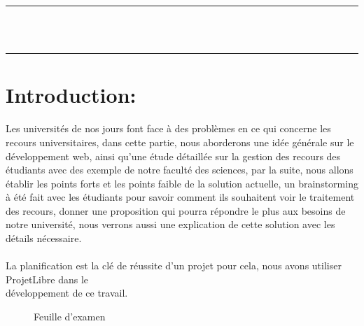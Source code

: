 \documentclass[12pt]{report}
\begin{document}
\newpage

\vspace*{\fill}
\begin{center}
    {\color{Blue} \rule{\linewidth}{1.2mm} }\\
\vspace{0.25in}
 {\centering{}}
\vspace{0.35in}\\
    {\color{Blue} \rule{\linewidth}{1.2mm} }
\end{center}
\vspace*{\fill}
\setcounter{section}{0}

\newpage

\section{Introduction:}
\vspace{0.2in}
Les universités de nos jours font face à des problèmes en ce qui concerne les recours universitaires, dans cette partie, nous aborderons une idée générale sur le développement web, ainsi qu'une étude détaillée sur la gestion des recours des étudiants avec des exemple de notre faculté des sciences, par la suite, nous allons établir les points forts et les points faible de la solution actuelle, un brainstorming à été fait avec les étudiants pour savoir comment ils souhaitent voir le traitement des recours, donner une proposition  qui pourra répondre le plus aux besoins de notre université, nous verrons aussi une explication de cette solution avec les  détails nécessaire.
\\\\
La planification est la clé de réussite d'un projet pour cela, nous avons utiliser ProjetLibre dans le \\développement de ce travail.

\vspace{0.7in}

\begin{figure}[h]
\centering
\caption{Feuille d'examen}
\end{figure}

\newpage
\end{document}

